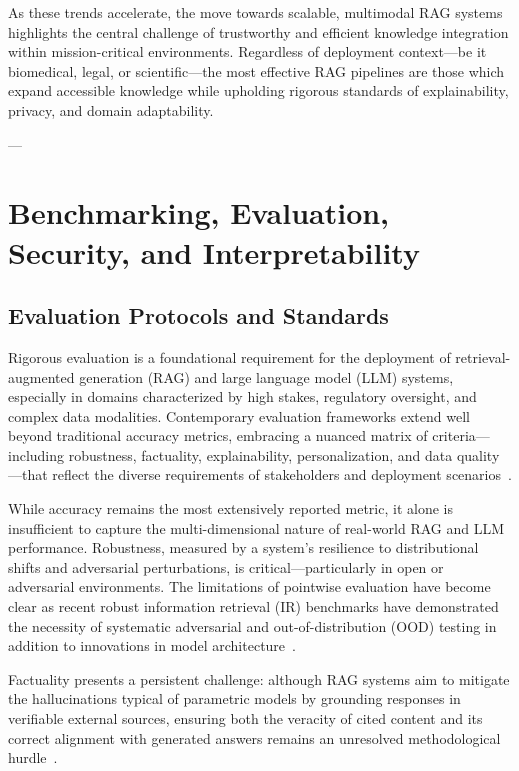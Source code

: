 \documentclass[11pt]{article}
\begin{document}
As these trends accelerate, the move towards scalable, multimodal RAG systems highlights the central challenge of trustworthy and efficient knowledge integration within mission-critical environments. Regardless of deployment context—be it biomedical, legal, or scientific—the most effective RAG pipelines are those which expand accessible knowledge while upholding rigorous standards of explainability, privacy, and domain adaptability.

---

\section{Benchmarking, Evaluation, Security, and Interpretability}

\subsection{Evaluation Protocols and Standards}

Rigorous evaluation is a foundational requirement for the deployment of retrieval-augmented generation (RAG) and large language model (LLM) systems, especially in domains characterized by high stakes, regulatory oversight, and complex data modalities. Contemporary evaluation frameworks extend well beyond traditional accuracy metrics, embracing a nuanced matrix of criteria—including robustness, factuality, explainability, personalization, and data quality—that reflect the diverse requirements of stakeholders and deployment scenarios~\cite{2,3,5,8,10,21,22,25,26,28,29,30,32,33,34,36,37,38,39,40,42,43,46,47,49,50,51,52,53,54,55,61,62}.

While accuracy remains the most extensively reported metric, it alone is insufficient to capture the multi-dimensional nature of real-world RAG and LLM performance. Robustness, measured by a system’s resilience to distributional shifts and adversarial perturbations, is critical—particularly in open or adversarial environments. The limitations of pointwise evaluation have become clear as recent robust information retrieval (IR) benchmarks have demonstrated the necessity of systematic adversarial and out-of-distribution (OOD) testing in addition to innovations in model architecture~\cite{49,50,54,61}. 

Factuality presents a persistent challenge: although RAG systems aim to mitigate the hallucinations typical of parametric models by grounding responses in verifiable external sources, ensuring both the veracity of cited content and its correct alignment with generated answers remains an unresolved methodological hurdle~\cite{32,33,34,36,37,49,51,52,53,54,55,61,62,63,64}. 
\end{document}
